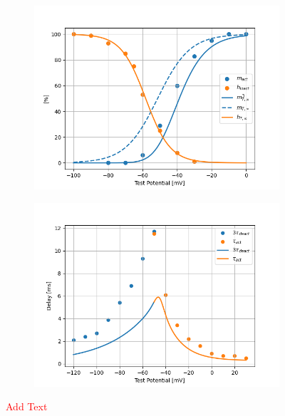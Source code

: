 \documentclass[../../workflow.tex]{subfiles}
\begin{document}
\begin{figure}[H]
    \centering
    \begin{subfigure}[t]{0.45\textwidth}
        \centering
        \includegraphics[width=\textwidth]{./img/t_type_calcium_channel/simulations/Scaling/Constant Field Equation1_steady_state_activation_inactivation.png}
        \caption{}
        \label{fig_r5_t_type_steady_state_activation_shifted}
    \end{subfigure}
    \hfill
    \begin{subfigure}[t]{0.45\textwidth}
        \centering
        \includegraphics[width=\textwidth]{./img/t_type_calcium_channel/simulations/Scaling/Constant Field Equation2_tau_m.png}
        \caption{}
        \label{fig_r5_t_type_tau_activation_scaled}
    \end{subfigure}
    
    \caption{\textcolor{red}{Add Text}}
    \label{fig_r5_t_type_shifting_scaling}
\end{figure}
\end{document}
